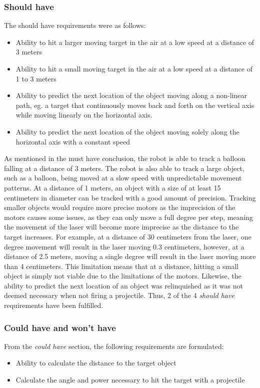 \subsubsection{Should have}
The should have requirements were as follows:
\begin{itemize}
	\item Ability to hit a larger moving target in the air at a low speed at a distance of 3 meters
	\item Ability to hit a small moving target in the air at a low speed at a distance of 1 to 3 meters
	\item Ability to predict the next location of the object moving along a non-linear path, eg{.} a target that continuously moves back and forth on the vertical axis while moving linearly on the horizontal axis.
	\item Ability to predict the next location of the object moving solely along the horizontal axis with a constant speed
\end{itemize}

As mentioned in the must have conclusion, the robot is able to track a balloon falling at a distance of 3 meters.
The robot is also able to track a large object, such as a balloon, being moved at a slow speed with unpredictable movement patterns.
At a distance of 1 meters, an object with a size of at least 15 centimeters in diameter can be tracked with a good amount of precision.
Tracking smaller objects would require more precise motors as the imprecision of the motors causes some issues, as they can only move a full degree per step, meaning the movement of the laser will become more imprecise as the distance to the target increases.
For example, at a distance of 30 centimeters from the laser, one degree movement will result in the laser moving 0.3 centimeters, however, at a distance of 2.5 meters, moving a single degree will result in the laser moving more than 4 centimeters.
This limitation means that at a distance, hitting a small object is simply not viable due to the limitations of the motors.
Likewise, the ability to predict the next location of an object was relinquished as it was not deemed necessary when not firing a projectile.
Thus, 2 of the 4 \textit{should have} requirements have been fulfilled.

\subsubsection{Could have and won't have}
From the \textit{could have} section, the following requirements are formulated:
\begin{itemize}
	\item Ability to calculate the distance to the target object
	\item Calculate the angle and power necessary to hit the target with a projectile
\end{itemize}


